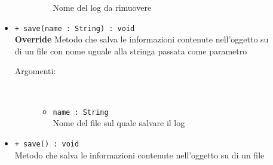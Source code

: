 \documentclass[../DefinizioneDiProdotto.tex]{subfiles}
\begin{document}
\begin{description}
\begin{itemize}
\begin{description}
\begin{itemize}
				Nome del log da rimuovere\end{itemize}
		\end{description}
		\item \texttt{+ save(name : String) : void}\\
		\textbf{Override} Metodo che salva le informazioni contenute nell'oggetto su di un file con nome uguale alla stringa passata come parametro
		\begin{description}
			\item[Argomenti:] \
			\begin{itemize}
				\item \texttt{name : String}\\
				Nome del file sul quale salvare il log\end{itemize}
		\end{description}
		\item \texttt{+ save() : void}\\
		Metodo che salva le informazioni contenute nell'oggetto su di un file
	\end{itemize}
\end{description}
\end{document}
